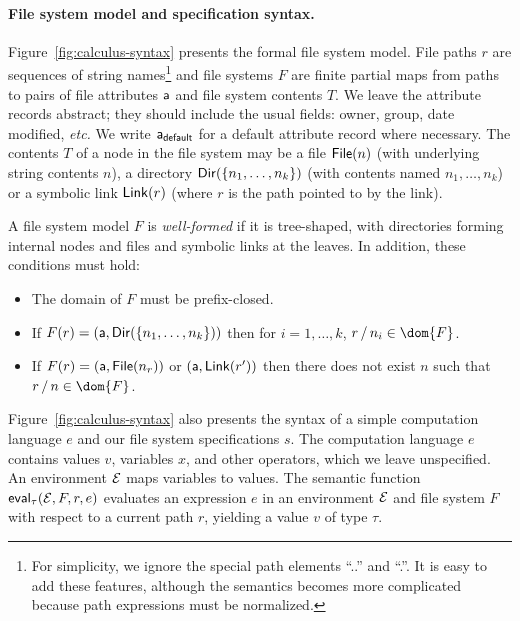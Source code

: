 \paragraph*{File system model and specification syntax.}
%
Figure~\ref{fig:calculus-syntax} presents the formal file system
model.  File paths $r$ are sequences of string names\footnote{For
  simplicity, we ignore the special path elements ``..'' and ``.''.
  It is easy to add these features, although the semantics becomes
  more complicated because path expressions must be normalized.}  and
file systems $F$ are finite partial maps from paths to pairs of file
attributes $\mathsf{a}$ and file system contents $T$.  We leave the
attribute records abstract; they should include the usual fields:
owner, group, date modified, {\it etc.}  We write $\mathsf{a}_{\mathsf{default}}$ for
a default attribute record where necessary.  The contents $T$ of a
node in the file system may be a file $\mathsf{File}(n)$ (with underlying
string contents $n$), a directory $\mathsf{Dir}( \{ n_1,\dots,n_k \} )$ (with
contents named $n_1, \ldots, n_k$) or a symbolic link $\mathsf{Link}(r)$
(where $r$ is the path pointed to by the link).

A file system model $F$ is {\em well-formed} if it is tree-shaped,
with directories forming internal nodes and files and symbolic links
at the leaves.  In addition, these conditions must hold:
\begin{itemize}
\item The domain of $F$ must be prefix-closed.
\item If $F(r) = (\mathsf{a},\mathsf{Dir}( \{ n_1,\dots,n_k \} ))$ then for $i=1,\ldots,k$,
$\PCons{r}{n_i} \in \dom{F}$.
\item  If $F(r) = (\mathsf{a},\mathsf{File}(n_r))$ or $(\mathsf{a},\mathsf{Link}(r'))$ then 
there does not exist $n$ such that $\PCons{r}{n} \in \dom{F}$.
\end{itemize}

Figure~\ref{fig:calculus-syntax} also presents the syntax of a simple
computation language $e$ and our file system specifications $s$.  The
computation language $e$ contains values $v$, variables $x$, and other
operators, which we leave unspecified.  An environment $\mathcal{E}$ maps
variables to values.  The semantic function $\mathsf{eval}_{\tau}(\mathcal{E},F,r,e)$
evaluates an expression $e$ in an environment $\mathcal{E}$ and file system
$F$ with respect to a current path $r$, yielding a value $v$ of type
$\tau$.

